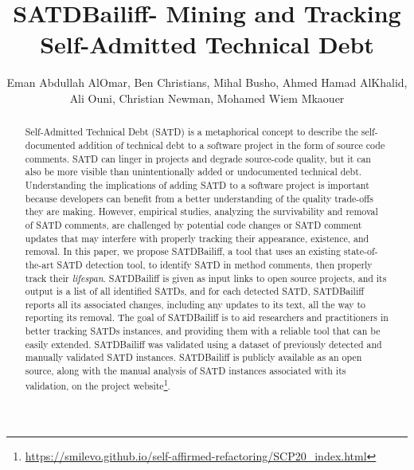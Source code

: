 \documentclass[3p]{elsarticle}
\newcommand{\approach}{SATDBailiff\xspace}
\begin{document}
\begin{frontmatter}


\title{\approach  - Mining and Tracking Self-Admitted Technical Debt}

\author{Eman Abdullah AlOmar, Ben Christians, Mihal Busho, Ahmed Hamad AlKhalid, Ali Ouni, Christian Newman, Mohamed Wiem Mkaouer}


\address{Rochester Institute of Technology, NY, USA \\ ETS Montreal, University of Quebec, Canada}



\begin{abstract}
Self-Admitted Technical Debt (SATD) is a metaphorical concept to describe the self-documented addition of technical debt to a software project in the form of source code comments.
SATD can linger in projects and degrade source-code quality, but it can also be more visible than unintentionally added or undocumented technical debt.
Understanding the implications of adding SATD to a software project is important because developers can benefit from a better understanding of the quality trade-offs they are making.
However, empirical studies, analyzing the survivability and removal of SATD comments, are challenged by potential code changes or SATD comment updates that may interfere with properly tracking their appearance, existence, and removal. 
In this paper, we propose \approach, a tool that uses an existing state-of-the-art SATD detection tool, to identify SATD in method comments, then properly track their \textit{lifespan}. \approach is given as input links to open source projects, and its output is a list of all identified SATDs, and for each detected SATD, \approach reports all its associated changes, including any updates to its text, all the way to reporting its removal. The goal of \approach is to aid researchers and practitioners in better tracking SATDs instances, and providing them with a reliable tool that can be easily extended.
\approach was validated using a dataset of previously detected and manually validated SATD instances. 
\approach is publicly available as an open source, along with the manual analysis of SATD instances associated with its validation, on the project website\footnote{\url{https://smilevo.github.io/self-affirmed-refactoring/SCP20_index.html}}.


\end{abstract}
\end{frontmatter}
\end{document}
